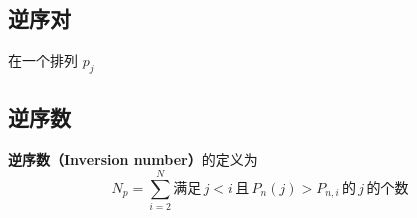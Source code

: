 
\begin{issues}
\issueDraft
\end{issues}


\subsection{逆序对}
在一个排列 $p_{j}$

\subsection{逆序数}
\textbf{逆序数（Inversion number）}的定义为
\begin{equation}\label{InvNum_eq5}
N_p = \sum_{i=2}^N \text{满足}\, j<i \,\text{且}\, P_n(j) > P_{n,i} \, \text{的}\, j\, \text{的个数} 
\end{equation}

